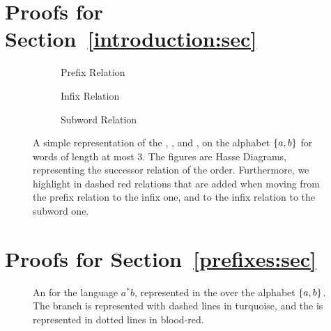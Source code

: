 
\clearpage

\section{Proofs for Section~\ref{introduction:sec}}

\begin{figure}
    \centering
    \begin{subfigure}[t]{0.48\textwidth}
    	\centering
    	
    	\caption{Prefix Relation}
   	\end{subfigure}%
   	\hfill%
   	\begin{subfigure}[t]{0.48\textwidth}
   		\centering
   		
   		\caption{Infix Relation}
   	\end{subfigure}
   	\begin{subfigure}[t]{0.48\textwidth}
   		\centering
   		
   		\caption{Subword Relation}
   	\end{subfigure}
   	
   	\caption{A simple representation of the ,
        ,
        and ,
        on the alphabet $\{ a,b \}$ for words of
        length at most $3$. The figures are Hasse Diagrams,
        representing the successor relation of the order.
        Furthermore, we highlight in dashed red relations that are added
        when moving from the prefix relation to the infix one,
        and to the infix relation to the subword one.}
    \label{word-embeddings:fig}
\end{figure}


\section{Proofs for Section~\ref{prefixes:sec}}

\begin{figure}
    \centering
    
    \caption{An  for the language $a^* b$,
        represented in the  over the alphabet $\{ a,b \}$.
        The branch is represented with dashed lines in turquoise, and the
         is represented in dotted lines in blood-red.
    }
    \label{antichain-branch:fig}
\end{figure}


